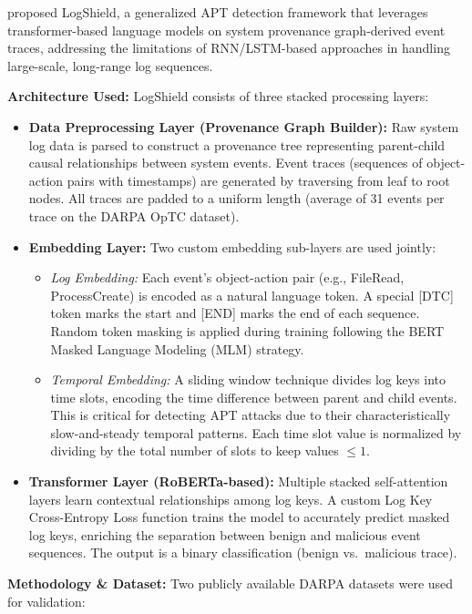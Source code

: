 \cite{anjum2023logshield} proposed LogShield, a generalized APT detection framework that leverages transformer-based language models on system provenance graph-derived event traces, addressing the limitations of RNN/LSTM-based approaches in handling large-scale, long-range log sequences.

\textbf{Architecture Used:} LogShield consists of three stacked processing layers:

\begin{itemize}
    \item \textbf{Data Preprocessing Layer (Provenance Graph Builder):} Raw system log data is parsed to construct a provenance tree representing parent-child causal relationships between system events. Event traces (sequences of object-action pairs with timestamps) are generated by traversing from leaf to root nodes. All traces are padded to a uniform length (average of 31 events per trace on the DARPA OpTC dataset).
    \item \textbf{Embedding Layer:} Two custom embedding sub-layers are used jointly:
    \begin{itemize}
        \item \textit{Log Embedding:} Each event's object-action pair (e.g., FileRead, ProcessCreate) is encoded as a natural language token. A special [DTC] token marks the start and [END] marks the end of each sequence. Random token masking is applied during training following the BERT Masked Language Modeling (MLM) strategy.
        \item \textit{Temporal Embedding:} A sliding window technique divides log keys into time slots, encoding the time difference between parent and child events. This is critical for detecting APT attacks due to their characteristically slow-and-steady temporal patterns. Each time slot value is normalized by dividing by the total number of slots to keep values $\leq 1$.
    \end{itemize}
    \item \textbf{Transformer Layer (RoBERTa-based):} Multiple stacked self-attention layers learn contextual relationships among log keys. A custom Log Key Cross-Entropy Loss function trains the model to accurately predict masked log keys, enriching the separation between benign and malicious event sequences. The output is a binary classification (benign vs.\ malicious trace).
\end{itemize}

\textbf{Methodology \& Dataset:} Two publicly available DARPA datasets were used for validation:

